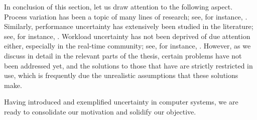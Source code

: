 \conclusioncut
In conclusion of this section, let us draw attention to the following aspect.
Process variation has been a topic of many lines of research; see, for instance,
\cite{bhardwaj2006, bhardwaj2008, chandra2010, juan2012, lee2013}. Similarly,
performance uncertainty has extensively been studied in the literature; see, for
instance, \cite{coskun2006, huang2009b, das2014c}. Workload uncertainty has not
been deprived of due attention either, especially in the real-time community;
see, for instance, \cite{diaz2002, santinelli2011, quinton2012, tanasa2015}.
However, as we discuss in detail in the relevant parts of the thesis, certain
problems have not been addressed yet, and the solutions to those that have are
strictly restricted in use, which is frequently due the unrealistic assumptions
that these solutions make.

Having introduced and exemplified uncertainty in computer systems, we are ready
to consolidate our motivation and solidify our objective.
